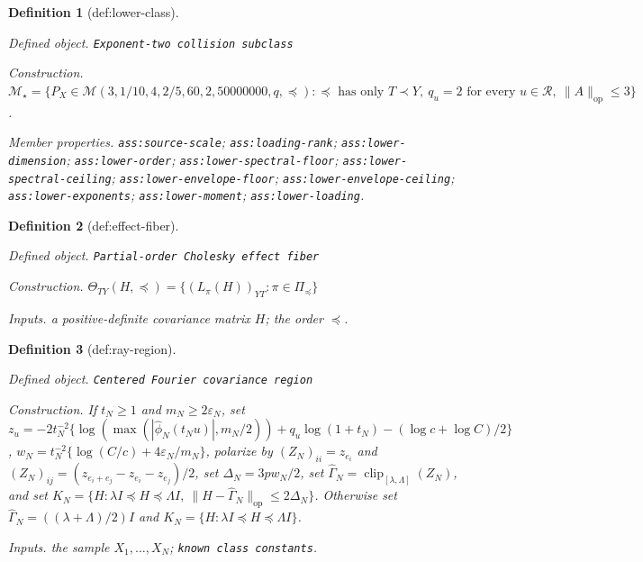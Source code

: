 \documentclass{article}
\newtheorem{definition}{Definition}
\begin{document}
\begin{definition}[def:lower-class]\label{def:lower-class}
\par\smallskip\noindent\emph{Defined object.} \texttt{Exponent-\allowbreak{}two collision subclass}
\par\smallskip\noindent\emph{Construction.} \(\mathcal M_\star=\{P_X\in\mathcal M(3,1/10,4,2/5,60,2,50000000,q,\preceq):\preceq\text{ has only }T\prec Y,\ q_u=2\text{ for every }u\in\mathcal R,\ \|A\|_{\mathrm{op}}\le3\}\).
\par\smallskip\noindent\emph{Member properties.} \texttt{ass:\allowbreak{}source-\allowbreak{}scale}; \texttt{ass:\allowbreak{}loading-\allowbreak{}rank}; \texttt{ass:\allowbreak{}lower-\allowbreak{}dimension}; \texttt{ass:\allowbreak{}lower-\allowbreak{}order}; \texttt{ass:\allowbreak{}lower-\allowbreak{}spectral-\allowbreak{}floor}; \texttt{ass:\allowbreak{}lower-\allowbreak{}spectral-\allowbreak{}ceiling}; \texttt{ass:\allowbreak{}lower-\allowbreak{}envelope-\allowbreak{}floor}; \texttt{ass:\allowbreak{}lower-\allowbreak{}envelope-\allowbreak{}ceiling}; \texttt{ass:\allowbreak{}lower-\allowbreak{}exponents}; \texttt{ass:\allowbreak{}lower-\allowbreak{}moment}; \texttt{ass:\allowbreak{}lower-\allowbreak{}loading}.
\end{definition}

\begin{definition}[def:effect-fiber]\label{def:effect-fiber}
\par\smallskip\noindent\emph{Defined object.} \texttt{Partial-\allowbreak{}order Cholesky effect fiber}
\par\smallskip\noindent\emph{Construction.} \(\Theta_{TY}(H,\preceq)=\{(L_\pi(H))_{YT}:\pi\in\Pi_{\preceq}\}\)
\par\smallskip\noindent\emph{Inputs.} a positive-definite covariance matrix \(H\); the order \(\preceq\).
\end{definition}

\begin{definition}[def:ray-region]\label{def:ray-region}
\par\smallskip\noindent\emph{Defined object.} \texttt{Centered Fourier covariance region}
\par\smallskip\noindent\emph{Construction.} If \(t_N\ge1\) and \(m_N\ge2\varepsilon_N\), set \(z_u=-2t_N^{-2}\{\log(\max(|\widehat\phi_N(t_Nu)|,m_N/2))+q_u\log(1+t_N)-(\log c+\log C)/2\}\), \(w_N=t_N^{-2}\{\log(C/c)+4\varepsilon_N/m_N\}\), polarize by \((Z_N)_{ii}=z_{e_i}\) and \((Z_N)_{ij}=(z_{e_i+e_j}-z_{e_i}-z_{e_j})/2\), set \(\Delta_N=3pw_N/2\), set \(\widehat\Gamma_N=\operatorname{clip}_{[\lambda,\Lambda]}(Z_N)\), and set \(K_N=\{H:\lambda I\preceq H\preceq\Lambda I,\ \|H-\widehat\Gamma_N\|_{\mathrm{op}}\le2\Delta_N\}\). Otherwise set \(\widehat\Gamma_N=((\lambda+\Lambda)/2)I\) and \(K_N=\{H:\lambda I\preceq H\preceq\Lambda I\}\).
\par\smallskip\noindent\emph{Inputs.} the sample \(X_1,\ldots,X_N\); \texttt{known class constants}.
\end{definition}
\end{document}

